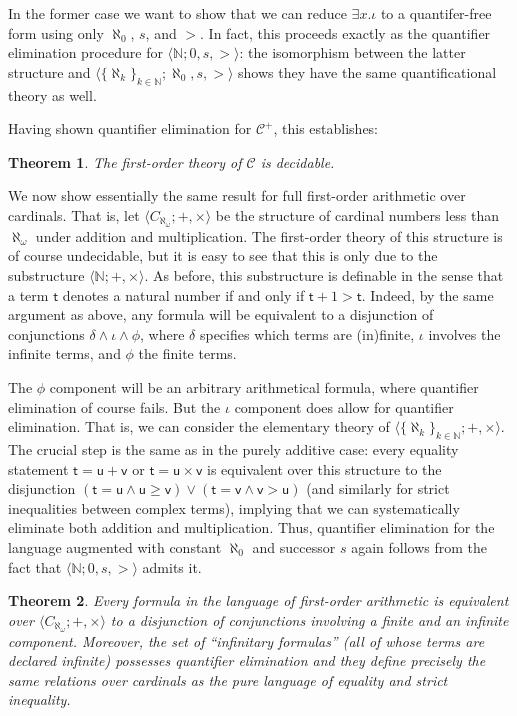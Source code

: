 \documentclass[12pt,oneside,reqno]{amsart}
\newtheorem{theorem}{Theorem}
\theoremstyle{definition}
\begin{document}
In the former case we want to show that we can reduce $\exists x. \iota$ to a quantifer-free form using only $\aleph_0$, $s$, and $>$. In fact, this proceeds exactly as the quantifier elimination procedure for $\langle \mathbb{N};0,s,> \rangle$: the isomorphism between the latter structure and %
$\langle \{\aleph_k\}_{k \in \mathbb{N}};\aleph_0,s,>\rangle$ shows they have the same quantificational theory as well.

Having shown quantifier elimination for $\mathcal{C}^+$, this establishes: \begin{theorem} \label{thm:decidablecardinal}
The first-order theory of $\mathcal{C}$ is decidable.
\end{theorem}

We now show essentially the same result for full first-order arithmetic over cardinals. That is, let $\langle C_{\aleph_{\omega}}; +,\times\rangle$ be the structure of cardinal numbers less than $\aleph_{\omega}$ under addition and multiplication. The first-order theory of this structure is of course undecidable, but it is easy to see that this is only due to the substructure $\langle \mathbb{N}; +,\times\rangle$. As before, this substructure is definable in the sense that a term $\mathsf{t}$ denotes a natural number if and only if $\mathsf{t}+1>\mathsf{t}$. Indeed, by the same argument as above, any formula will be equivalent to a disjunction of conjunctions $\delta \wedge \iota \wedge \phi$, where $\delta$ specifies which terms are (in)finite, $\iota$ involves the infinite terms, and $\phi$ the finite terms. 

The $\phi$ component will be an arbitrary arithmetical formula, where quantifier elimination of course fails. But the $\iota$ component does allow for quantifier elimination. That is, we can consider the elementary theory of $\langle \{\aleph_{k}\}_{k \in \mathbb{N}}; +,\times\rangle$. The crucial step is the same as in the purely additive case: every equality statement $\mathsf{t}=\mathsf{u}+\mathsf{v}$ or $\mathsf{t}=\mathsf{u}\times \mathsf{v}$ is equivalent over this structure to the disjunction $(\mathsf{t}=\mathsf{u} \wedge \mathsf{u} \geq \mathsf{v}) \vee (\mathsf{t}=\mathsf{v} \wedge \mathsf{v} > \mathsf{u})$ (and similarly for strict inequalities between complex terms), implying that we can systematically eliminate both addition and multiplication. Thus, quantifier elimination for the language augmented with constant $\aleph_0$ and successor $s$ again follows from the fact that $\langle \mathbb{N};0,s,> \rangle$ admits it. 
\begin{theorem} Every formula in the language of first-order arithmetic is equivalent over $\langle C_{\aleph_{\omega}}; +,\times\rangle$ to a disjunction of conjunctions involving a finite and an infinite component. Moreover, the set of ``infinitary formulas'' (all of whose terms are declared infinite) possesses quantifier elimination and they define precisely the same relations over cardinals as the pure language of equality and strict inequality. 
\end{theorem}
\end{document}

